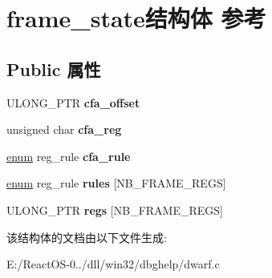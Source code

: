 \hypertarget{structframe__state}{}\section{frame\+\_\+state结构体 参考}
\label{structframe__state}
\subsection*{Public 属性}
\begin{DoxyCompactItemize}
\item 
\mbox{\label{structframe__state_a8874a8257e557b260ee4f891c41e2588}} 
U\+L\+O\+N\+G\+\_\+\+P\+TR {\bfseries cfa\+\_\+offset}
\item 
\mbox{\label{structframe__state_a76e9bc0ca73070ffff4896f087fbc6ef}} 
unsigned char {\bfseries cfa\+\_\+reg}
\item 
\mbox{\label{structframe__state_a382289d0e190781d7bfed9cc5284f4ab}} 
\hyperlink{interfaceenum}{enum} reg\+\_\+rule {\bfseries cfa\+\_\+rule}
\item 
\mbox{\label{structframe__state_a3312f54638dccf169baf5ed190e803dc}} 
\hyperlink{interfaceenum}{enum} reg\+\_\+rule {\bfseries rules} \mbox{[}N\+B\+\_\+\+F\+R\+A\+M\+E\+\_\+\+R\+E\+GS\mbox{]}
\item 
\mbox{\label{structframe__state_a109abdecce5a9a12f46984d4b1c059a7}} 
U\+L\+O\+N\+G\+\_\+\+P\+TR {\bfseries regs} \mbox{[}N\+B\+\_\+\+F\+R\+A\+M\+E\+\_\+\+R\+E\+GS\mbox{]}
\end{DoxyCompactItemize}


该结构体的文档由以下文件生成\+:\begin{DoxyCompactItemize}
\item 
E\+:/\+React\+O\+S-\/0../dll/win32/dbghelp/dwarf.\+c\end{DoxyCompactItemize}

